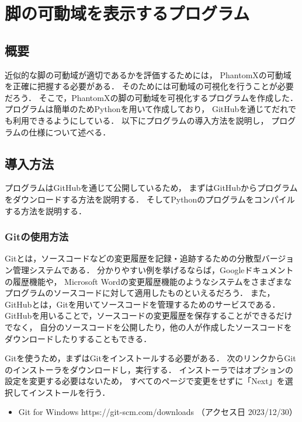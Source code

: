 ﻿

\chapter{脚の可動域を表示するプログラム}\label{chapter:leg_range_python}

\section{概要}
近似的な脚の可動域が適切であるかを評価するためには，
PhantomXの可動域を正確に把握する必要がある．
そのためには可動域の可視化を行うことが必要だろう．
そこで，PhantomXの脚の可動域を可視化するプログラムを作成した．
プログラムは簡単のためPythonを用いて作成しており，
GitHubを通じてだれでも利用できるようにしている．
以下にプログラムの導入方法を説明し，
プログラムの仕様について述べる．

\section{導入方法}
プログラムはGitHubを通じて公開しているため，
まずはGitHubからプログラムをダウンロードする方法を説明する．
そしてPythonのプログラムをコンパイルする方法を説明する．

\subsection{Gitの使用方法}
Gitとは，ソースコードなどの変更履歴を記録・追跡するための分散型バージョン管理システムである．
分かりやすい例を挙げるならば，Googleドキュメントの履歴機能や，
Microsoft Wordの変更履歴機能のようなシステムをさまざまなプログラムのソースコードに対して適用したものといえるだろう．
また，GitHubとは，Gitを用いてソースコードを管理するためのサービスである．
GitHubを用いることで，ソースコードの変更履歴を保存することができるだけでなく，
自分のソースコードを公開したり，他の人が作成したソースコードをダウンロードしたりすることもできる．

Gitを使うため，まずはGitをインストールする必要がある．
次のリンクからGitのインストーラをダウンロードし，実行する．
インストーラではオプションの設定を変更する必要はないため，
すべてのページで変更をせずに「Next」を選択してインストールを行う．

\begin{itemize}
  \item Git for Windows https://git-scm.com/downloads （アクセス日 2023/12/30）
\end{itemize}

